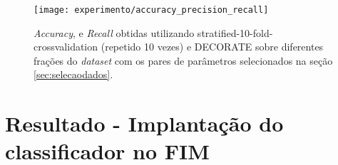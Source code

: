 \begin{figure}[!htb] \centering 
  \centering
  \texttt{[image: experimento/accuracy\_precision\_recall]} 
  \caption{\textit{Accuracy},  e \textit{Recall} obtidas utilizando stratified-10-fold-crossvalidation (repetido 10 vezes) e DECORATE sobre diferentes frações do \textit{dataset} com os pares de parâmetros  selecionados na seção \ref{sec:selecaodados}.} 
  \label{fig:accuracy_precision_recall}
\end{figure}

\section{Resultado - Implantação do classificador no FIM}
\label{sec:resultados}

 


 

 

 

